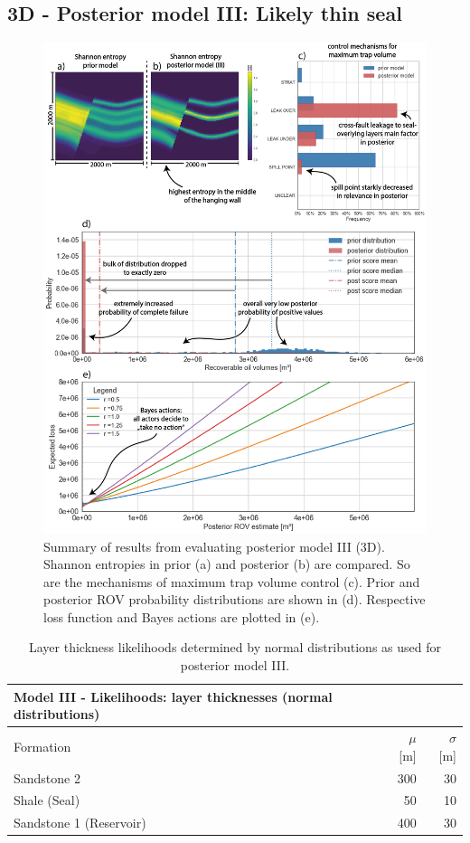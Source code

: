 		\subsection{3D - Posterior model III: Likely thin seal}%
		\begin{figure}[p!]
			\centering
			\includegraphics[width=1\textwidth]{Figures/ML2}
			\caption{Summary of results from evaluating posterior model III (3D). Shannon entropies in prior (a) and posterior (b) are compared. So are the mechanisms of maximum trap volume control (c). Prior and posterior ROV probability distributions are shown in (d). Respective loss function and Bayes actions are plotted in (e).}\label{fig:ML2}
		\end{figure}
		\begin{table}[h]
			\centering
			\begin{tabular}{lrr} 
				\toprule
				Model III - Likelihoods: layer thicknesses (normal distributions)\\  
				\midrule 
				Formation & $\mu$ [m] & $\sigma$ [m]\\ 
				\midrule 
				Sandstone 2 & 300 & 30 \\
				Shale (Seal) & 50 & 10\\ 
				Sandstone 1 (Reservoir) & 400 & 30 \\
				\bottomrule
			\end{tabular}
			\caption{Layer thickness likelihoods determined by normal distributions as used for posterior model III.}
			\label{tab:ML2_likelihoods}
		\end{table}

